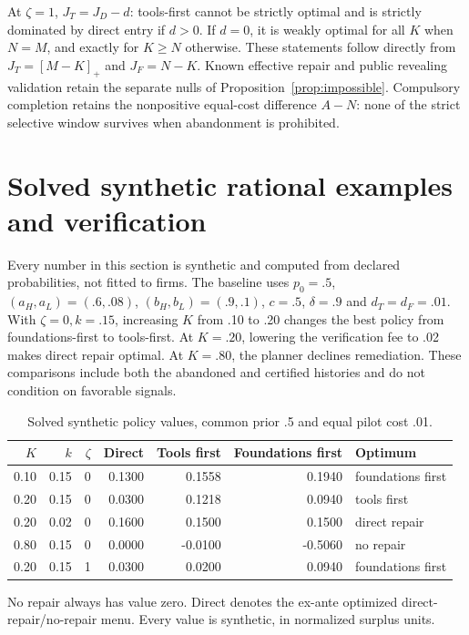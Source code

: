 \documentclass[11pt]{article}
\begin{document}
At $\zeta=1$, $J_T=J_D-d$: tools-first cannot be strictly optimal and is strictly dominated by direct entry if $d>0$. If $d=0$, it is weakly optimal for all $K$ when $N=M$, and exactly for $K\geq N$ otherwise. These statements follow directly from $J_T=[M-K]_+$ and $J_F=N-K$. Known effective repair and public revealing validation retain the separate nulls of Proposition~\ref{prop:impossible}. Compulsory completion retains the nonpositive equal-cost difference $A-N$: none of the strict selective window survives when abandonment is prohibited.

\section{Solved synthetic rational examples and verification}\label{sec:rationalnumbers}
Every number in this section is synthetic and computed from declared probabilities, not fitted to firms. The baseline uses $p_0=.5$, $(a_H,a_L)=(.6,.08)$, $(b_H,b_L)=(.9,.1)$, $c=.5$, $\delta=.9$ and $d_T=d_F=.01$. With $\zeta=0,k=.15$, increasing $K$ from .10 to .20 changes the best policy from foundations-first to tools-first. At $K=.20$, lowering the verification fee to .02 makes direct repair optimal. At $K=.80$, the planner declines remediation. These comparisons include both the abandoned and certified histories and do not condition on favorable signals.

\begin{table}[ht]\centering\small
\caption{Solved synthetic policy values, common prior .5 and equal pilot cost .01.}
\begin{tabular}{rrrrrrl}\toprule
$K$ & $k$ & $\zeta$ & Direct & Tools first & Foundations first & Optimum\\\midrule
0.10 & 0.15 & 0 & 0.1300 & 0.1558 & 0.1940 & foundations first\\
0.20 & 0.15 & 0 & 0.0300 & 0.1218 & 0.0940 & tools first\\
0.20 & 0.02 & 0 & 0.1600 & 0.1500 & 0.1500 & direct repair\\
0.80 & 0.15 & 0 & 0.0000 & -0.0100 & -0.5060 & no repair\\
0.20 & 0.15 & 1 & 0.0300 & 0.0200 & 0.0940 & foundations first\\
\bottomrule\end{tabular}
\par\smallskip\footnotesize No repair always has value zero. Direct denotes the ex-ante optimized direct-repair/no-repair menu. Every value is synthetic, in normalized surplus units.
\end{table}
\end{document}
